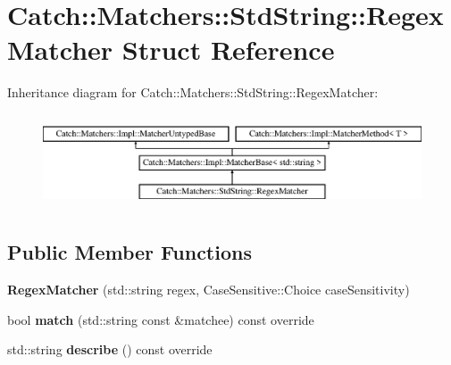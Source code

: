 \hypertarget{struct_catch_1_1_matchers_1_1_std_string_1_1_regex_matcher}{}\section{Catch\+:\+:Matchers\+:\+:Std\+String\+:\+:Regex\+Matcher Struct Reference}
\label{struct_catch_1_1_matchers_1_1_std_string_1_1_regex_matcher}
Inheritance diagram for Catch\+:\+:Matchers\+:\+:Std\+String\+:\+:Regex\+Matcher\+:\begin{figure}[H]
\begin{center}
\leavevmode
\includegraphics[height=2.818792cm]{struct_catch_1_1_matchers_1_1_std_string_1_1_regex_matcher}
\end{center}
\end{figure}
\subsection*{Public Member Functions}
\begin{DoxyCompactItemize}
\item 
\mbox{\label{struct_catch_1_1_matchers_1_1_std_string_1_1_regex_matcher_ab914deb885fe25558c41ab368c6b3916}} 
{\bfseries Regex\+Matcher} (std\+::string regex, Case\+Sensitive\+::\+Choice case\+Sensitivity)
\item 
\mbox{\label{struct_catch_1_1_matchers_1_1_std_string_1_1_regex_matcher_aa8e61adccabb2f36133029301f6b8f4e}} 
bool {\bfseries match} (std\+::string const \&matchee) const override
\item 
\mbox{\label{struct_catch_1_1_matchers_1_1_std_string_1_1_regex_matcher_a1f788cd5258c987e5043f6c7f43adeb9}} 
std\+::string {\bfseries describe} () const override
\end{DoxyCompactItemize}
